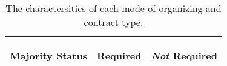 \begin{table}[!h]
\begin{tabular}{p{30mm}p{87mm}p{87mm}}
\begin{center} \textbf{Majority Status} \end{center} &	%
\begin{center}\begin{flushleft} Required \end{flushleft}\end{center} &	%
\begin{center}\begin{flushleft} \textit{Not} Required \end{flushleft}\end{center} \\ %
\midrule
\bottomrule
\end{tabular}
	\captionsetup{justification=centering, singlelinecheck=false, margin=3cm} 
    \caption[Differences in Organizing and Contracts]{The charactersitics of each mode of organizing and contract type.}
    \label{tab:contracts}
\end{table}
